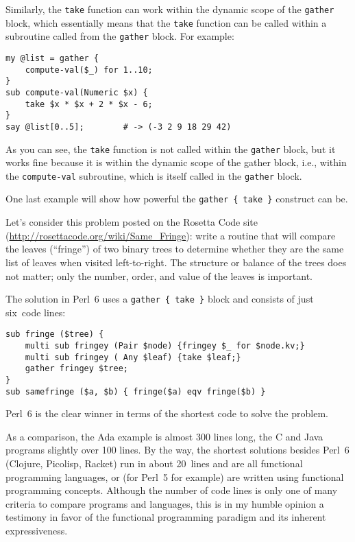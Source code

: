 Similarly, the {\tt take} function 
can work within the dynamic scope of the \verb'gather' 
block, which essentially means that the {\tt take} 
function can be called within a subroutine called from 
the \verb'gather' block. For example:

\begin{verbatim}
my @list = gather {
    compute-val($_) for 1..10; 
}
sub compute-val(Numeric $x) {
    take $x * $x + 2 * $x - 6;
}
say @list[0..5];        # -> (-3 2 9 18 29 42)
\end{verbatim}

As you can see, the {\tt take} function is not called 
within the {\tt gather} block, but it works fine because 
it is within the dynamic scope of the gather block, i.e., 
within the {\tt compute-val} subroutine, which is itself 
called in the {\tt gather} block.

One last example will show how powerful the 
\verb'gather { take }' construct can be.

Let's consider this problem posted on the Rosetta Code 
site (\url{http://rosettacode.org/wiki/Same_Fringe}): 
write a routine that will compare the leaves (``fringe'') 
of two binary trees to determine whether they are the 
same list of leaves when visited left-to-right. The 
structure or balance of the trees does not matter; 
only the number, order, and value of the leaves is 
important. 

The solution in Perl~6 uses a \verb'gather { take }' 
block and consists of just six~code lines:

\begin{verbatim}
sub fringe ($tree) {
    multi sub fringey (Pair $node) {fringey $_ for $node.kv;}
    multi sub fringey ( Any $leaf) {take $leaf;}
    gather fringey $tree;
}
sub samefringe ($a, $b) { fringe($a) eqv fringe($b) }
\end{verbatim}

Perl~6 is the clear winner in terms of the shortest code to 
solve the problem.

As a comparison, the Ada example is almost 300 lines long, 
the C and Java programs slightly over 100 lines. By the way, 
the shortest solutions besides Perl~6 (Clojure, Picolisp, 
Racket) run in about 20~lines and are all functional 
programming languages, or (for Perl~5 for example) are 
written using functional programming concepts. 
Although the number of code lines is only one of many 
criteria to compare programs and languages, this is 
in my humble opinion a testimony in favor of the functional 
programming paradigm and its inherent expressiveness.


